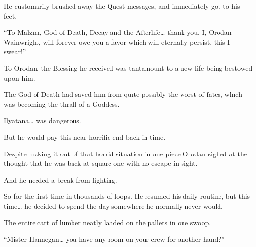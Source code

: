 \documentclass[a4paper,10pt]{book}
\begin{document}
He customarily brushed away the Quest messages, and immediately got to his feet.\par
“To Malzim, God of Death, Decay and the Afterlife… thank you. I, Orodan Wainwright, will forever owe you a favor which will eternally persist, this I swear!”\par
To Orodan, the Blessing he received was tantamount to a new life being bestowed upon him.\par
The God of Death had saved him from quite possibly the worst of fates, which was becoming the thrall of a Goddess.\par
Ilyatana… was dangerous.\par
But he would pay this near horrific end back in time.\par
Despite making it out of that horrid situation in one piece Orodan sighed at the thought that he was back at square one with no escape in sight.\par
And he needed a break from fighting.\par
So for the first time in thousands of loops. He resumed his daily routine, but this time… he decided to spend the day somewhere he normally never would.\par
The entire cart of lumber neatly landed on the pallets in one swoop.\par
“Mister Hannegan… you have any room on your crew for another hand?”\par
\end{document}
